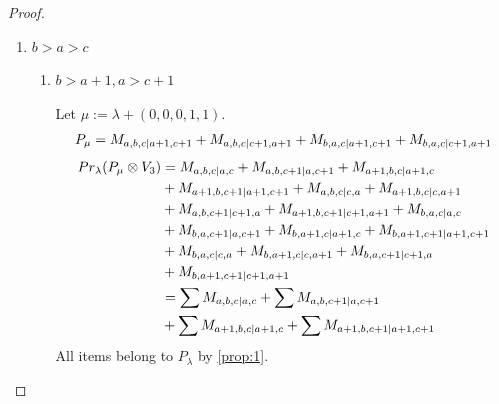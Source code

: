 \begin{proof}
\begin{enumerate}
    \item $b>a>c$
      \begin{enumerate}
        \item $b>a+1,a>c+1$ \par
        Let $\mu:=\lambda + (0,0,0,1,1) $.
        \begin{equation}\notag
          \begin{aligned}
            P_\mu = M_{a,b,c|a+1,c+1}
+ M_{a,b,c|c+1,a+1}
+ M_{b,a,c|a+1,c+1}
+ M_{b,a,c|c+1,a+1}
          \end{aligned}
        \end{equation}
        \begin{equation}\notag
          \begin{aligned}
            Pr_{\lambda}(P_\mu \otimes V_{3}) &=
M_{a,b,c|a,c}
+ M_{a,b,c+1|a,c+1}
+ M_{a+1,b,c|a+1,c}\\
                                              &
+ M_{a+1,b,c+1|a+1,c+1}
+ M_{a,b,c|c,a}
+ M_{a+1,b,c|c,a+1}\\
                                              &
+ M_{a,b,c+1|c+1,a}
+ M_{a+1,b,c+1|c+1,a+1}
+ M_{b,a,c|a,c}\\
                                              &
+ M_{b,a,c+1|a,c+1}
+ M_{b,a+1,c|a+1,c}
+ M_{b,a+1,c+1|a+1,c+1}\\
                                              &
+ M_{b,a,c|c,a}
+ M_{b,a+1,c|c,a+1}
+ M_{b,a,c+1|c+1,a}\\
                                              &
+ M_{b,a+1,c+1|c+1,a+1} \\
                                               &=
\sum M_{a,b,c|a,c}
+ \sum M_{a,b,c+1|a,c+1}\\
                                              &
+ \sum M_{a+1,b,c|a+1,c}
+ \sum M_{a+1,b,c+1|a+1,c+1}
          \end{aligned}
        \end{equation}
All items belong to $P_\lambda$ by \cref{prop:1}.


\end{enumerate}
\end{enumerate}
\end{proof}
